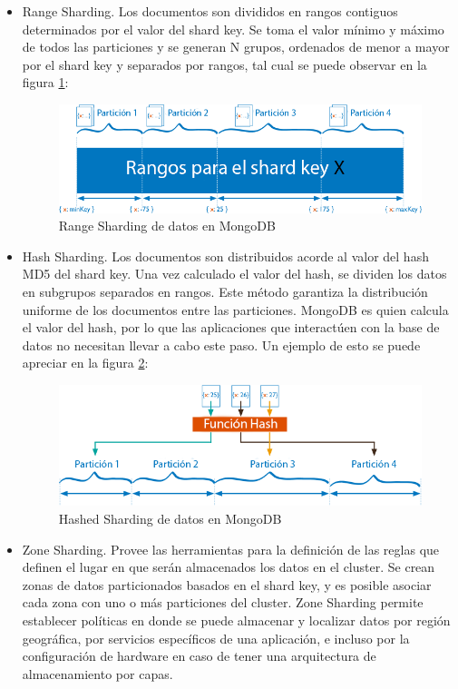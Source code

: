 \begin{itemize}

\item Range Sharding. Los documentos son divididos en rangos contiguos determinados por el valor del shard key. Se toma el valor
mínimo y máximo de todos las particiones y se generan N grupos, ordenados de menor a mayor por el shard key y separados por rangos,
tal cual se puede observar en la figura \ref{fig:ranged_sharding}:

\begin{figure}[H]
	\centering
		\includegraphics[width=.7\textwidth]{figures/ranged_sharding}
	\caption{Range Sharding de datos en MongoDB}
	\label{fig:ranged_sharding}
\end{figure}

\item Hash Sharding. Los documentos son distribuidos acorde al valor del hash MD5 del shard key. Una vez calculado el valor del hash, se
dividen los datos en subgrupos separados en rangos. Este método garantiza la distribución uniforme de los documentos entre las particiones.
MongoDB es quien calcula el valor del hash, por lo que las aplicaciones que interactúen con la base de datos no necesitan llevar a cabo este paso.
Un ejemplo de esto se puede apreciar en la figura \ref{fig:hashed_sharding}:

\begin{figure}[H]
	\centering
		\includegraphics[width=.7\textwidth]{figures/hashed_sharding}
	\caption{Hashed Sharding de datos en MongoDB}
	\label{fig:hashed_sharding}
\end{figure}

\item Zone Sharding. Provee las herramientas para la definición de las reglas que definen el lugar en que serán almacenados los datos
en el cluster. Se crean zonas de datos particionados basados en el shard key, y es posible asociar cada zona con uno o más particiones
del cluster. Zone Sharding permite establecer políticas en donde se puede almacenar y localizar datos por región geográfica, por
servicios específicos de una aplicación, e incluso por la configuración de hardware en caso de tener una arquitectura de almacenamiento
por capas.


\end{itemize}

